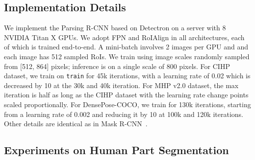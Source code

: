 \documentclass[10pt,twocolumn,letterpaper]{article}
\begin{document}
\subsection{Implementation Details} 
We implement the Parsing R-CNN based on Detectron on a server with 8 NVIDIA Titan X GPUs. We adopt FPN and RoIAlign in all architectures, each of which is trained end-to-end. A mini-batch involves 2 images per GPU and and each image has 512 sampled RoIs.  We train using image scales randomly sampled from [512, 864] pixels; inference is on a single scale of 800 pixels. For CIHP dataset,  we train on \texttt{train} for 45k iterations, with a learning rate of 0.02 which is decreased by 10 at the 30k and 40k iteration. For MHP v2.0 dataset,  the max iteration is half as long as the CIHP dataset with the learning rate change points scaled proportionally. For DensePose-COCO,  we train for 130k iterations, starting from a learning rate of 0.002 and reducing it by 10 at 100k and 120k iterations. Other details are identical as in Mask R-CNN~\cite{He_iccv2017_maskrcnn, Goyal_arxiv2017_1hour}.

\subsection{Experiments on Human Part Segmentation} 
\end{document}
